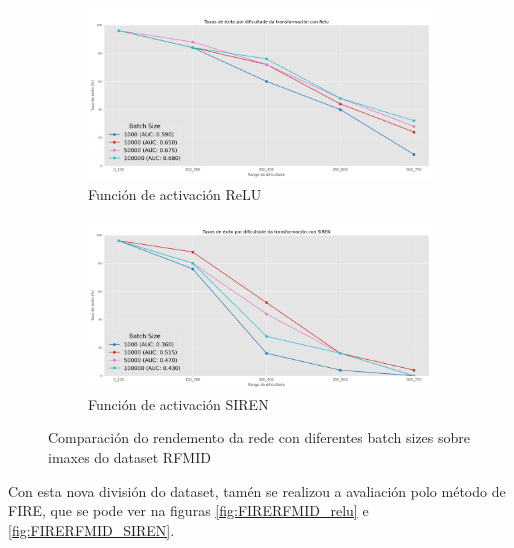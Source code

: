 \begin{figure}[ht]
    \centering
    \begin{subfigure}[b]{0.5\textwidth}
        \centering
        \includegraphics[width=\textwidth]{imaxes/batchsize/experiment_plot_RFMID_bs_relu.png}
        \caption{Función de activación ReLU}
        \label{fig:batch_size_comparison_relu_rfmid}
    \end{subfigure}\hfill
    \begin{subfigure}[b]{0.5\textwidth}
        \centering
        \includegraphics[width=\textwidth]{imaxes/batchsize/experiment_plot_RFMID_bs_siren.png}
        \caption{Función de activación SIREN}
        \label{fig:batch_size_comparison_siren_rfmid}
    \end{subfigure}
    \caption{Comparación do rendemento da rede con diferentes batch sizes sobre imaxes do dataset RFMID}
    \label{fig:batch_size_comparisons_rfmid}
\end{figure}

Con esta nova división do dataset, tamén se realizou a avaliación polo método de FIRE, que se pode ver na figuras \ref{fig:FIRERFMID_relu} e \ref{fig:FIRERFMID_SIREN}.

